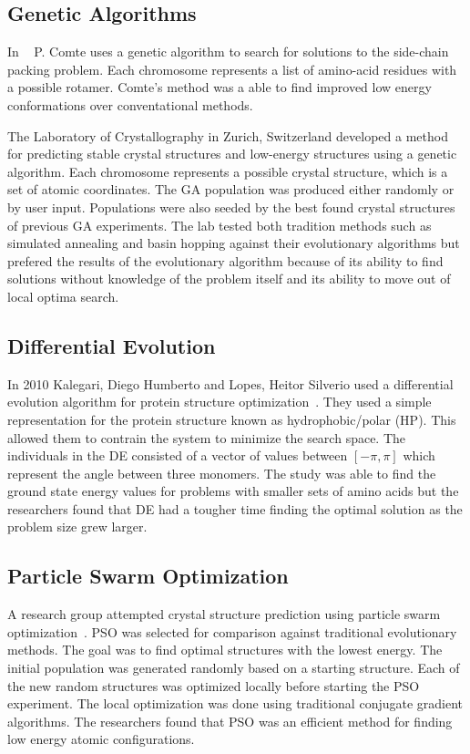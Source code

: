 \subsection{Genetic Algorithms}

In ~\cite{comte2010bio} P. Comte uses a genetic algorithm to search for solutions to the side-chain packing problem. Each chromosome represents a list of amino-acid residues with a possible rotamer. Comte's method was a able to find improved low energy conformations over conventational methods.

The Laboratory of Crystallography in Zurich, Switzerland developed a method~\cite{oganov2006crystal} for predicting stable crystal structures and low-energy structures using a genetic algorithm. Each chromosome represents a possible crystal structure, which is a set of atomic coordinates. The GA population was produced either randomly or by user input. Populations were also seeded by the best found crystal structures of previous GA experiments. The lab tested both tradition methods such as simulated annealing and basin hopping against their evolutionary algorithms but prefered the results of the evolutionary algorithm because of its ability to find solutions without knowledge of the problem itself and its ability to move out of local optima search.

\subsection{Differential Evolution}

In 2010 Kalegari, Diego Humberto and Lopes, Heitor Silverio used a differential evolution algorithm for protein structure optimization~\cite{kalegari2010differential}. They used a simple representation for the protein structure known as hydrophobic/polar (HP). This allowed them to contrain the system to minimize the search space. The individuals in the DE consisted of a vector of values between $[-\pi, \pi]$ which represent the angle between three monomers. The study was able to find the ground state energy values for problems with smaller sets of amino acids but the researchers found that DE had a tougher time finding the optimal solution as the problem size grew larger.

\subsection{Particle Swarm Optimization}

A research group attempted crystal structure prediction using particle swarm optimization~\cite{wang2010crystal}. PSO was selected for comparison against traditional evolutionary methods. The goal was to find optimal structures with the lowest energy. The initial population was generated randomly based on a starting structure. Each of the new random structures was optimized locally before starting the PSO experiment. The local optimization was done using traditional conjugate gradient algorithms. The researchers found that PSO was an efficient method for finding low energy atomic configurations.